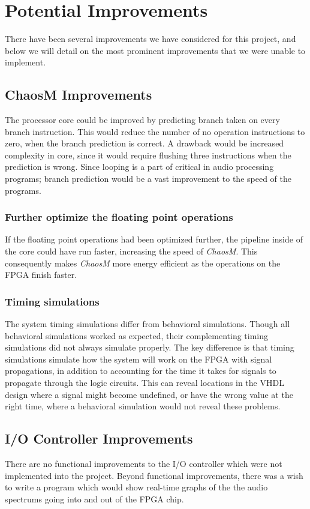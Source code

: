 \section{Potential Improvements}

There have been several improvements we have considered for this project, and
below we will detail on the most prominent improvements that we were unable to
implement.

\subsection{ChaosM Improvements}

The processor core could be improved by predicting branch taken on every branch
instruction. This would reduce the number of no operation instructions to zero,
when the branch prediction is correct. A drawback would be increased complexity
in core, since it would require flushing three instructions when the prediction
is wrong. Since looping is a part of critical in audio processing programs;
branch prediction would be a vast improvement to the speed of the programs.
\subsubsection{Further optimize the floating point operations}

If the floating point operations had been optimized further, the pipeline inside
of the core could have run faster, increasing the speed of \textit{ChaosM}. This
consequently makes \textit{ChaosM} more energy efficient as the operations on
the FPGA finish faster.

\subsubsection{Timing simulations}
The system timing simulations differ from behavioral simulations. Though all
behavioral simulations worked as expected, their complementing timing
simulations did not always simulate properly. The key difference is that timing
simulations simulate how the system will work on the FPGA with signal
propagations, in addition to accounting for the time it takes for signals to
propagate through the logic circuits. This can reveal locations in the VHDL
design where a signal might become undefined, or have the wrong value at the
right time, where a behavioral simulation would not reveal these problems.

\subsection{I/O Controller Improvements}
There are no functional improvements to the I/O controller which were not
implemented into the project. Beyond functional improvements, there was a
wish to write a program which would show real-time graphs of the the audio
spectrums going into and out of the FPGA chip.

